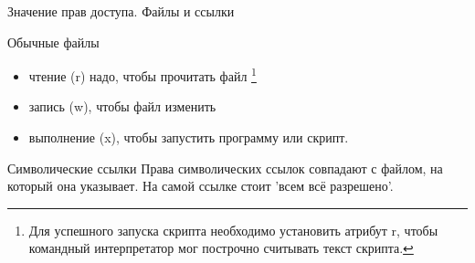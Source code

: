 \begin{frame}{Значение прав доступа. Файлы и ссылки}

  \begin{block}{Обычные файлы}
    \begin{itemize}
      \item чтение \alert{(r)} надо, чтобы прочитать файл
	\footnote{Для успешного запуска скрипта необходимо установить атрибут \alert{r}, чтобы командный интерпретатор мог построчно считывать текст скрипта.}
      \item запись \alert{(w)}, чтобы файл изменить
      \item выполнение \alert{(x)}, чтобы запустить программу или скрипт.
    \end{itemize}
  \end{block} \pause

  \begin{block}{Символические ссылки}
    \small{Права символических ссылок совпадают с файлом, на который она указывает. На самой ссылке стоит 'всем всё разрешено'.}
  \end{block}

\end{frame}
